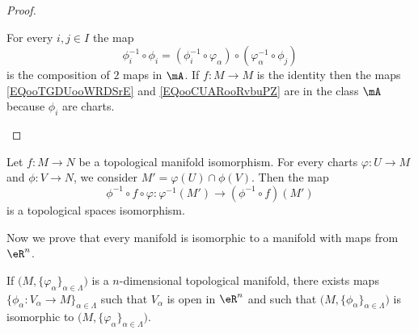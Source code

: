 \begin{proof}
\begin{subproof}
		For every \( i,j\in I\) the map
		\begin{equation}
			\phi_i^{-1}\circ\phi_i=(\phi_i^{-1}\circ\varphi_{\alpha})\circ(\varphi_{\alpha}^{-1}\circ \phi_j)
		\end{equation}
		is the composition of \( 2\) maps in \( \mA\).
		\spitem[Isomorphism]
		If \(f \colon M\to M  \) is the identity then the maps \eqref{EQooTGDUooWRDSrE} and \eqref{EQooCUARooRvbuPZ} are in the class \( \mA\) because \( \phi_i\) are charts.
	\end{subproof}
\end{proof}



\begin{proposition}	\label{PROPooNOZNooZFYOwK}
	Let \(f \colon M\to N  \) be a topological manifold isomorphism. For every charts \(\varphi \colon U\to M  \) and \(\phi \colon V\to N  \), we consider \( M'=\varphi(U)\cap \phi(V)\). Then the map
	\begin{equation}
		\phi^{-1}\circ f\circ\varphi \colon \varphi^{-1}(M')\to (\phi^{-1}\circ f)(M')
	\end{equation}
	is a topological spaces isomorphism.
\end{proposition}

Now we prove that every manifold is isomorphic to a manifold with maps from \( \eR^n\).
\begin{proposition}	\label{PROPooNVVSooAVVLOM}
	If \( \big( M,\{ \varphi_{\alpha} \}_{\alpha\in \Lambda} \big)\) is a \( n\)-dimensional topological manifold, there exists maps \( \{\phi_{\alpha} \colon V_{\alpha}\to M   \}_{\alpha\in\Lambda}\) such that \( V_{\alpha}\) is open in \( \eR^n\) and such that \( \big( M,\{ \phi_{\alpha} \}_{\alpha\in \Lambda} \big)\) is isomorphic to \( \big( M,\{ \varphi_{\alpha} \}_{\alpha\in\Lambda} \big)\).
\end{proposition}

